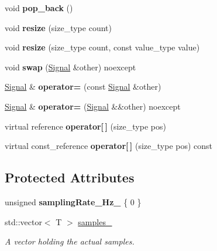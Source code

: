\begin{DoxyCompactItemize}
void {\bfseries pop\+\_\+back} ()
\item 
\mbox{\label{classdsp_1_1_signal_a164a6eed368e07d8d1f75d7581868a80}} 
void {\bfseries resize} (size\+\_\+type count)
\item 
\mbox{\label{classdsp_1_1_signal_a00dfa31797fb4514872abf09f210c6df}} 
void {\bfseries resize} (size\+\_\+type count, const value\+\_\+type value)
\item 
\mbox{\label{classdsp_1_1_signal_a01251c45f35748003e4bfbd363e539b9}} 
void {\bfseries swap} (\mbox{\hyperlink{classdsp_1_1_signal}{Signal}} \&other) noexcept
\item 
\mbox{\label{classdsp_1_1_signal_a16c58a5871b0aa3e0291a6d76280a56d}} 
\mbox{\hyperlink{classdsp_1_1_signal}{Signal}} \& {\bfseries operator=} (const \mbox{\hyperlink{classdsp_1_1_signal}{Signal}} \&other)
\item 
\mbox{\label{classdsp_1_1_signal_a880337756d5678b9977188f680b34939}} 
\mbox{\hyperlink{classdsp_1_1_signal}{Signal}} \& {\bfseries operator=} (\mbox{\hyperlink{classdsp_1_1_signal}{Signal}} \&\&other) noexcept
\item 
\mbox{\label{classdsp_1_1_signal_a74205d6c933c098ce443d2f46830b559}} 
virtual reference {\bfseries operator\mbox{[}$\,$\mbox{]}} (size\+\_\+type pos)
\item 
\mbox{\label{classdsp_1_1_signal_ab2fc2e8558b97ce72dd4c2dc43a624c3}} 
virtual const\+\_\+reference {\bfseries operator\mbox{[}$\,$\mbox{]}} (size\+\_\+type pos) const
\end{DoxyCompactItemize}
\subsection*{Protected Attributes}
\begin{DoxyCompactItemize}
\item 
\mbox{\label{classdsp_1_1_signal_a7379e642c2b424d068d6288c7623c5a3}} 
unsigned {\bfseries sampling\+Rate\+\_\+\+Hz\+\_\+} \{ 0 \}
\item 
\mbox{\label{classdsp_1_1_signal_a17e9746c320be9f435349c6d3ecd2e58}} 
std\+::vector$<$ T $>$ \mbox{\hyperlink{classdsp_1_1_signal_a17e9746c320be9f435349c6d3ecd2e58}{samples\+\_\+}}
\begin{DoxyCompactList}\small\item\em A vector holding the actual samples. \end{DoxyCompactList}\end{DoxyCompactItemize}
